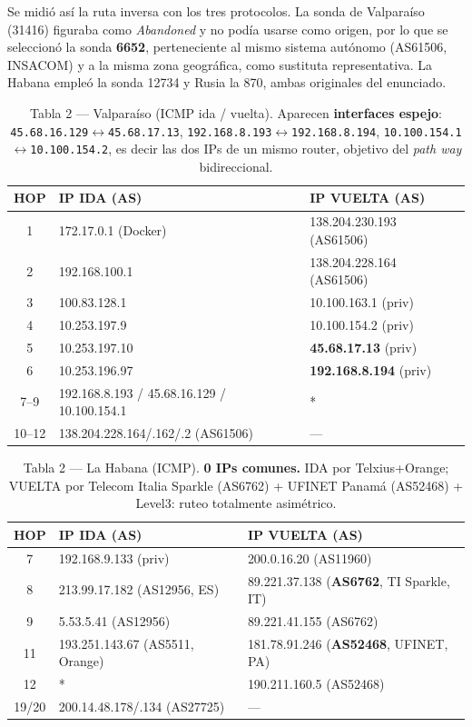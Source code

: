 \documentclass[11pt,a4paper]{article}
\newcommand{\ip}[1]{\texttt{#1}}
\begin{document}
Se midió así la ruta inversa con los tres protocolos. La sonda de Valparaíso (31416) figuraba como
\emph{Abandoned} y no podía usarse como origen, por lo que se seleccionó la sonda \textbf{6652},
perteneciente al mismo sistema autónomo (AS61506, INSACOM) y a la misma zona geográfica, como
sustituta representativa. La Habana empleó la sonda 12734 y Rusia la 870, ambas originales del
enunciado.

\begin{table}[H]
\centering\footnotesize
\begin{tabular}{c|ll}
\toprule
HOP & IP IDA (AS) & IP VUELTA (AS) \\
\midrule
1 & 172.17.0.1 (Docker) & 138.204.230.193 (AS61506) \\
2 & 192.168.100.1 & 138.204.228.164 (AS61506) \\
3 & 100.83.128.1 & 10.100.163.1 (priv) \\
4 & 10.253.197.9 & 10.100.154.2 (priv) \\
5 & 10.253.197.10 & \textbf{45.68.17.13} (priv) \\
6 & 10.253.196.97 & \textbf{192.168.8.194} (priv) \\
7--9 & 192.168.8.193 / 45.68.16.129 / 10.100.154.1 & * \\
10--12 & 138.204.228.164/.162/.2 (AS61506) & --- \\
\bottomrule
\end{tabular}
\caption{Tabla 2 --- Valparaíso (ICMP ida / vuelta). Aparecen \textbf{interfaces espejo}:
\ip{45.68.16.129}$\leftrightarrow$\ip{45.68.17.13}, \ip{192.168.8.193}$\leftrightarrow$\ip{192.168.8.194},
\ip{10.100.154.1}$\leftrightarrow$\ip{10.100.154.2}, es decir las dos IPs de un mismo router,
objetivo del \emph{path way} bidireccional.}
\end{table}

\begin{table}[H]
\centering\footnotesize
\begin{tabular}{c|ll}
\toprule
HOP & IP IDA (AS) & IP VUELTA (AS) \\
\midrule
7 & 192.168.9.133 (priv) & 200.0.16.20 (AS11960) \\
8 & 213.99.17.182 (AS12956, ES) & 89.221.37.138 (\textbf{AS6762}, TI Sparkle, IT) \\
9 & 5.53.5.41 (AS12956) & 89.221.41.155 (AS6762) \\
11 & 193.251.143.67 (AS5511, Orange) & 181.78.91.246 (\textbf{AS52468}, UFINET, PA) \\
12 & * & 190.211.160.5 (AS52468) \\
19/20 & 200.14.48.178/.134 (AS27725) & --- \\
\bottomrule
\end{tabular}
\caption{Tabla 2 --- La Habana (ICMP). \textbf{0 IPs comunes.} IDA por Telxius+Orange; VUELTA por
Telecom Italia Sparkle (AS6762) + UFINET Panamá (AS52468) + Level3: ruteo totalmente asimétrico.}
\end{table}
\end{document}
